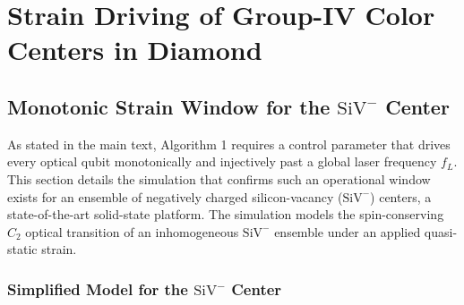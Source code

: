 \clearpage


\section{Strain Driving of Group-IV Color Centers in Diamond}






\subsection{Monotonic Strain Window for the \(\mathrm{SiV}^{-}\) Center}

As stated in the main text, Algorithm 1 requires a control parameter that drives every optical qubit monotonically and injectively past a global laser frequency $f_L$. This section details the simulation that confirms
such an operational window exists for an ensemble of negatively charged silicon-vacancy (\(\mathrm{SiV}^{-}\)) centers, a
state-of-the-art solid-state platform. The simulation models the spin-conserving $C_2$ optical transition of an
inhomogeneous \(\mathrm{SiV}^{-}\) ensemble under an applied quasi-static strain.

\subsubsection{Simplified Model for the \(\mathrm{SiV}^{-}\) Center}




